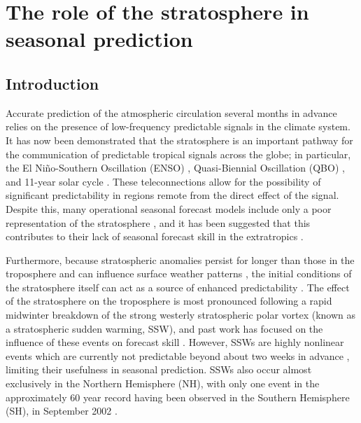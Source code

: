 \chapter{The role of the stratosphere in seasonal prediction}

\section{Introduction}

Accurate prediction of the atmospheric circulation several months in advance
relies on the presence of low-frequency predictable signals in the climate
system. It has now been demonstrated that the stratosphere is an important
pathway for the communication of predictable tropical signals across the globe;
in particular, the El Ni\~no-Southern Oscillation (ENSO) \citep{Pascoe2006,
Bell2009, Ineson2009, Hurwitz2011}, Quasi-Biennial Oscillation (QBO)
\citep{Marshall2009, Garfinkel2011}, and 11-year solar cycle \citep{Kodera2002,
Gray2013}. These teleconnections allow for the possibility of significant
predictability in regions remote from the direct effect of the signal. Despite
this, many operational seasonal forecast models include only a poor
representation of the stratosphere \citep{Maycock2011}, and it has been
suggested that this contributes to their lack of seasonal forecast skill in the
extratropics \citep{Smith2012}.

Furthermore, because stratospheric anomalies persist for longer than those in
the troposphere and can influence surface weather patterns
\citep[e.g.,][]{Baldwin2001a}, the initial conditions of the stratosphere itself
can act as a source of enhanced predictability \citep{Baldwin2003a,
Charlton2003, Hardiman2011}. The effect of the stratosphere on the troposphere
is most pronounced following a rapid midwinter breakdown of the strong westerly
stratospheric polar vortex (known as a stratospheric sudden warming, SSW), and
past work has focused on the influence of these events on forecast skill
\citep{Kuroda2008, Sigmond2013}. However, SSWs are highly nonlinear events which
are currently not predictable beyond about two weeks in advance
\citep{Marshall2010}, limiting their usefulness in seasonal prediction. SSWs
also occur almost exclusively in the Northern Hemisphere (NH), with only one
event in the approximately 60 year record having been observed in the Southern
Hemisphere (SH), in September 2002 \citep{Roscoe2005}. 

